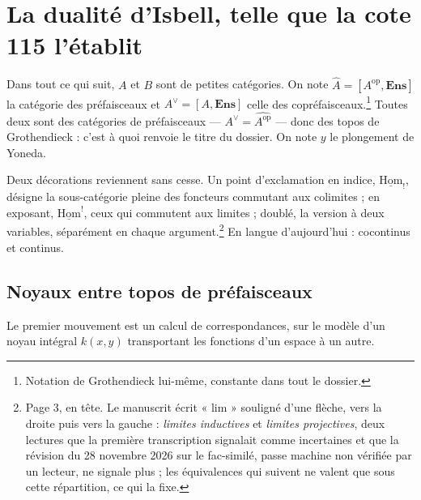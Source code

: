 \documentclass[11pt,a4paper]{article}
\begin{document}
\section*{La dualité d'Isbell, telle que la cote 115 l'établit}

Dans tout ce qui suit, $A$ et $B$ sont de petites catégories. On note
$\widehat{A} = [A^{\mathrm{op}}, \mathbf{Ens}]$ la catégorie des préfaisceaux
et $A^{\vee} = [A, \mathbf{Ens}]$ celle des copréfaisceaux.\footnote{Notation
de Grothendieck lui-même, constante dans tout le dossier.} Toutes deux sont
des catégories de préfaisceaux — $A^{\vee} = \widehat{A^{\mathrm{op}}}$ — donc
des topos de Grothendieck : c'est à quoi renvoie le titre du dossier. On note
$y$ le plongement de Yoneda.

Deux décorations reviennent sans cesse. Un point d'exclamation en indice,
$\underline{\mathrm{Hom}}_{!}$, désigne la sous-catégorie pleine des foncteurs
commutant aux colimites ; en exposant, $\underline{\mathrm{Hom}}^{!}$, ceux
qui commutent aux limites ; doublé, la version à deux variables, séparément en
chaque argument.\footnote{Page 3, en tête. Le manuscrit écrit « lim »
souligné d'une flèche, vers la droite puis vers la gauche : \emph{limites
inductives} et \emph{limites projectives}, deux lectures que la première
transcription signalait comme incertaines et que la révision du 28 novembre 2026 sur le fac-similé, passe machine non vérifiée par un lecteur,
ne signale plus ; les équivalences qui suivent ne valent que sous
cette répartition, ce qui la fixe.} En langue d'aujourd'hui : cocontinus et
continus.

\subsection*{Noyaux entre topos de préfaisceaux}

Le premier mouvement est un calcul de correspondances, sur le modèle d'un
noyau intégral $k(x,y)$ transportant les fonctions d'un espace à un autre.
\end{document}

